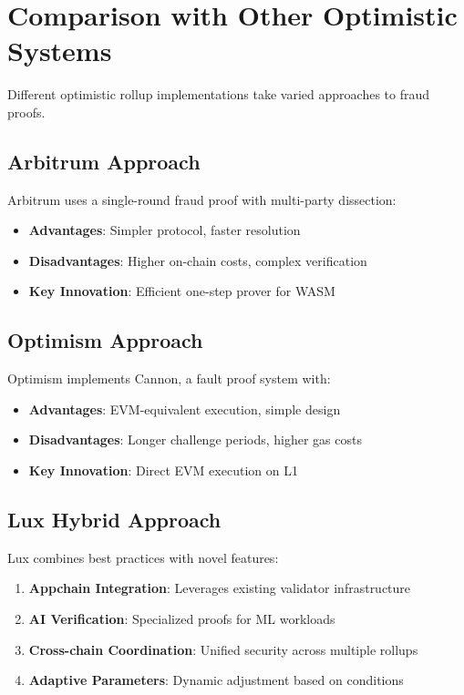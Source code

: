 \section{Comparison with Other Optimistic Systems}


Different optimistic rollup implementations take varied approaches to fraud proofs.

\subsection{Arbitrum Approach}

Arbitrum uses a single-round fraud proof with multi-party dissection:

\begin{itemize}
    \item \textbf{Advantages}: Simpler protocol, faster resolution
    \item \textbf{Disadvantages}: Higher on-chain costs, complex verification
    \item \textbf{Key Innovation}: Efficient one-step prover for WASM
\end{itemize}

\subsection{Optimism Approach}

Optimism implements Cannon, a fault proof system with:

\begin{itemize}
    \item \textbf{Advantages}: EVM-equivalent execution, simple design
    \item \textbf{Disadvantages}: Longer challenge periods, higher gas costs
    \item \textbf{Key Innovation}: Direct EVM execution on L1
\end{itemize}

\subsection{Lux Hybrid Approach}

Lux combines best practices with novel features:

\begin{enumerate}
    \item \textbf{Appchain Integration}: Leverages existing validator infrastructure
    \item \textbf{AI Verification}: Specialized proofs for ML workloads
    \item \textbf{Cross-chain Coordination}: Unified security across multiple rollups
    \item \textbf{Adaptive Parameters}: Dynamic adjustment based on conditions
\end{enumerate}

